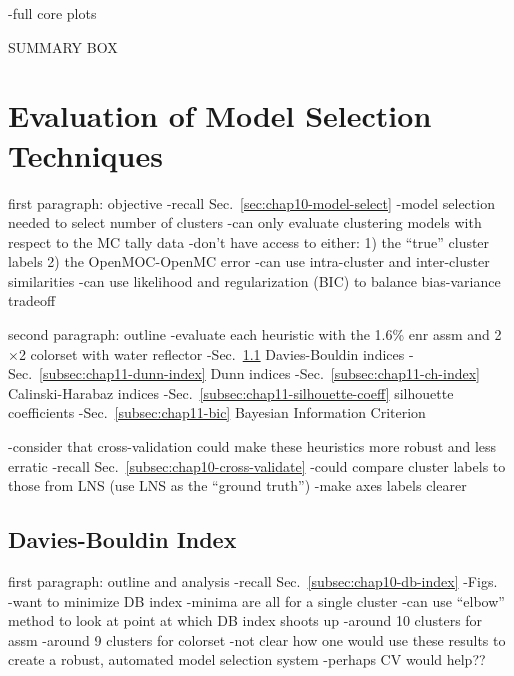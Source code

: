 -full core plots

SUMMARY BOX


\section{Evaluation of Model Selection Techniques}
\label{sec:chap11-model-select}

first paragraph: objective
-recall Sec.~\ref{sec:chap10-model-select}
-model selection needed to select number of clusters
  -can only evaluate clustering models with respect to the \ac{MC} tally data
  -don't have access to either:
    1) the ``true'' cluster labels
    2) the OpenMOC-OpenMC error
-can use intra-cluster and inter-cluster similarities
-can use likelihood and regularization (BIC) to balance bias-variance tradeoff

second paragraph: outline
-evaluate each heuristic with the 1.6\% enr assm and 2$\times$2 colorset with water reflector
-Sec.~\ref{subsec:chap11-db-index} Davies-Bouldin indices
-Sec.~\ref{subsec:chap11-dunn-index} Dunn indices
-Sec.~\ref{subsec:chap11-ch-index} Calinski-Harabaz indices
-Sec.~\ref{subsec:chap11-silhouette-coeff} silhouette coefficients
-Sec.~\ref{subsec:chap11-bic} Bayesian Information Criterion

-consider that cross-validation could make these heuristics more robust and less erratic
  -recall Sec.~\ref{subsec:chap10-cross-validate}
-could compare cluster labels to those from LNS (use LNS as the ``ground truth'')
-make axes labels clearer

\subsection{Davies-Bouldin Index}
\label{subsec:chap11-db-index}

first paragraph: outline and analysis
-recall Sec.~\ref{subsec:chap10-db-index}
-Figs.~
-want to minimize DB index
-minima are all for a single cluster
-can use ``elbow'' method to look at point at which DB index shoots up
  -around 10 clusters for assm
  -around 9 clusters for colorset
-not clear how one would use these results to create a robust, automated model selection system
  -perhaps CV would help??

